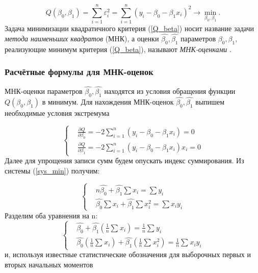 \documentclass[../body.tex]{subfiles}
\begin{document}
	\begin{equation}
		Q(\beta_{0}, \beta_{1}) = \sum_{i=1}^{n}{\varepsilon_{i}^{2}} = 
		\sum_{i=1}^{n}{(y_{i} - \beta_{0} - \beta_{1}x_{i})^{2}}\rightarrow \min_{\beta_{0}, \beta_{1}}.
		\label{Q_beta}
	\end{equation}
	Задача минимизации квадратичного критерия (\ref{Q_beta}) носит название задачи \textit{метода наименьших квадратов} (МНК), а оценки $\widehat{\beta_{0}}, \widehat{\beta_{1}}$ параметров $\beta_{0}, \beta_{1}$, реализующие минимум критерия (\ref{Q_beta}), называют \textit{МНК-оценками} \cite[c.~508]{max}. 
	
	\subsubsection{Расчётные формулы для МНК-оценок}
	МНК-оценки параметров $\widehat{\beta_{0}}, \widehat{\beta_{1}}$ находятся из условия обращения функции $Q(\beta_{0}, \beta_{1})$ в минимум. 
	\newline
	Для нахождения МНК-оценок $\widehat{\beta_{0}}, \widehat{\beta_{1}}$ выпишем необходимые условия экстремума
	
	\begin{equation}
		\begin{cases}
			& \frac{\partial Q}{\partial \beta_{0}}  = 
			-2\sum_{i=1}^{n}{(y_{i} - \beta_{0} - \beta_{1}x_{i})} = 0\\ 
			
			& \frac{\partial Q}{\partial \beta_{1}}  = 
			-2\sum_{i=1}^{n}{(y_{i} - \beta_{0} - \beta_{1}x_{i})x_{i}} = 0 
		\end{cases}
		\label{sys_min}
	\end{equation}
	Далее для упрощения записи сумм будем опускать индекс суммирования. Из системы (\ref{sys_min}) получим:
	
	\begin{equation}
		\begin{cases}
			& n\widehat{\beta_{0}} + \widehat{\beta_{1}}\sum{x_{i}} = \sum{y_{i}}\\ 
			& \widehat{\beta_{0}}\sum{x_{i}} + \widehat{\beta_{1}}\sum{x_{i}^{2}} = \sum{x_{i}y_{i}}
		\end{cases}
	\end{equation}
	Разделим оба уравнения на n:
	\begin{equation}
		\begin{cases}
			& \widehat{\beta_{0}} + \widehat{\beta_{1}}(\frac{1}{n}\sum_{}{}{x_{i}}) = 
			\frac{1}{n}\sum_{}{}{y_{i}}\\ 
			
			& \widehat{\beta_{0}}(\frac{1}{n}\sum_{}{}{x_{i}}) + \widehat{\beta_{1}}(\frac{1}{n}\sum_{}{}{x_{i}^{2}}) = \frac{1}{n}\sum_{}{}{x_{i}y_{i}}
		\end{cases}
		\label{sys_3}
	\end{equation}
	и, используя известные статистические обозначения для выборочных первых и вторых начальных моментов
	
\end{document}
